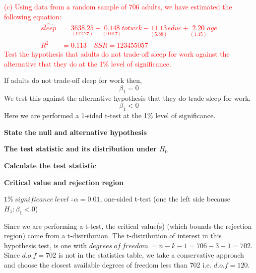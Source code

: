 \documentclass[12pt]{report}
\begin{document}
\noindent \textcolor{red}{(c) Using data from a random sample of 706 adults, we have estimated the following equation: \begin{align}
	\widehat{sleep} &= \underset{(112.27)}{3638.25} - \underset{(0.017)}{0.148}totwrk - \underset{(5.88)}{11.13}educ + \underset{(1.45)}{2.20}age \\
	R^2 &= 0.113 \quad SSR = 123455057 \nonumber
	\end{align} Test the hypothesis that adults do not trade-off sleep for work against the alternative that they do at the 1\% level of significance.
}

\noindent If adults do not trade-off sleep for work then, $$\beta_1 = 0$$ We test this against the alternative hypothesis that they do trade sleep for work, $$\beta_1 < 0$$ Here we are performed a 1-sided t-test at the 1\% level of significance.

\noindent \textbf{State the null and alternative hypothesis}

\noindent \textbf{The test statistic and its distribution under $H_0$}

\noindent \textbf{Calculate the test statistic}

\noindent \textbf{Critical value and rejection region}

\noindent $1\%\ significance\ level\ \therefore \alpha = 0.01$, one-sided t-test (one the left side because $H_1: \beta_1 < 0$)

\noindent Since we are performing a t-test, the critical value(s) (which bounds the rejection region) come from a t-distribution. The t-distribution of interest in this hypothesis test, is one with $degrees\ of\ freedom\ = n - k - 1 = 706 - 3 - 1 = 702$. Since $d.o.f = 702$ is not in the statistics table, we take a conservative approach and choose the closest available degrees of freedom less than 702 i.e. $d.o.f=120$. 
\end{document}
